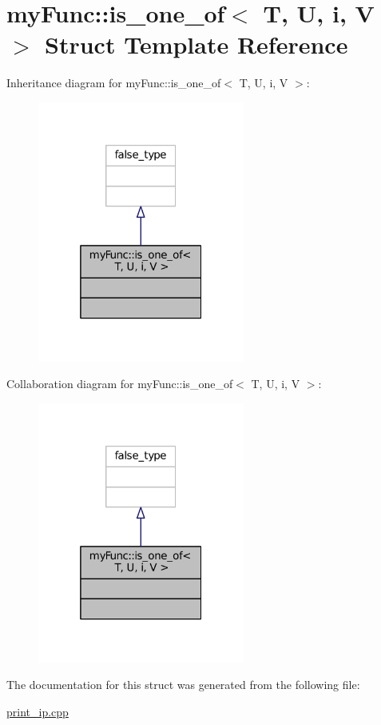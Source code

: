 \hypertarget{structmyFunc_1_1is__one__of}{}\section{my\+Func\+:\+:is\+\_\+one\+\_\+of$<$ T, U, i, V $>$ Struct Template Reference}
\label{structmyFunc_1_1is__one__of}


Inheritance diagram for my\+Func\+:\+:is\+\_\+one\+\_\+of$<$ T, U, i, V $>$\+:
\nopagebreak
\begin{figure}[H]
\begin{center}
\leavevmode
\includegraphics[width=193pt]{structmyFunc_1_1is__one__of__inherit__graph}
\end{center}
\end{figure}


Collaboration diagram for my\+Func\+:\+:is\+\_\+one\+\_\+of$<$ T, U, i, V $>$\+:
\nopagebreak
\begin{figure}[H]
\begin{center}
\leavevmode
\includegraphics[width=193pt]{structmyFunc_1_1is__one__of__coll__graph}
\end{center}
\end{figure}


The documentation for this struct was generated from the following file\+:\begin{DoxyCompactItemize}
\item 
\hyperlink{print__ip_8cpp}{print\+\_\+ip.\+cpp}\end{DoxyCompactItemize}
